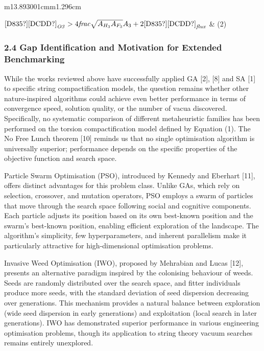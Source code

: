 \documentclass{article}
\begin{document}
\begin{center}
\tablefirsthead{}
\tablehead{}
\tabletail{}
\tablelasttail{}
\begin{supertabular}{m{13.893001cm}m{1.296cm}}

$\text{[D835?][DCDD?]}_{\mathit{O3}}\text{\hspace{0pt}}>4\mathit{frac}\sqrt{\text{\hspace{0pt}}A_{H_3}\text{\hspace{0pt}}\text{\hspace{0pt}}A_{F_3}}A_3\text{\hspace{0pt}}\text{\hspace{0pt}}\text{\hspace{0pt}}+2\text{[D835?][DCDD?]}_{\mathit{flux}}\text{\hspace{0pt}}$
 &
(2)\\
\end{supertabular}
\end{center}
\subsubsection{2.4 Gap Identification and Motivation for Extended Benchmarking}
While the works reviewed above have successfully applied GA [2], [8] and SA [1] to specific string compactification
models, the question remains whether other nature-inspired algorithms could achieve even better performance in terms of
convergence speed, solution quality, or the number of vacua discovered. Specifically, no systematic comparison of
different metaheuristic families has been performed on the torsion compactification model defined by Equation (1). The
No Free Lunch theorem [10] reminds us that no single optimisation algorithm is universally superior; performance
depends on the specific properties of the objective function and search space.

Particle Swarm Optimisation (PSO), introduced by Kennedy and Eberhart [11], offers distinct advantages for this problem
class. Unlike GAs, which rely on selection, crossover, and mutation operators, PSO employs a swarm of particles that
move through the search space following social and cognitive components. Each particle adjusts its position based on
its own best-known position and the swarm's best-known position, enabling efficient exploration of the landscape. The
algorithm's simplicity, few hyperparameters, and inherent parallelism make it particularly attractive for
high-dimensional optimisation problems.

Invasive Weed Optimisation (IWO), proposed by Mehrabian and Lucas [12], presents an alternative paradigm inspired by the
colonising behaviour of weeds. Seeds are randomly distributed over the search space, and fitter individuals produce
more seeds, with the standard deviation of seed dispersion decreasing over generations. This mechanism provides a
natural balance between exploration (wide seed dispersion in early generations) and exploitation (local search in later
generations). IWO has demonstrated superior performance in various engineering optimisation problems, though its
application to string theory vacuum searches remains entirely unexplored.
\end{document}
